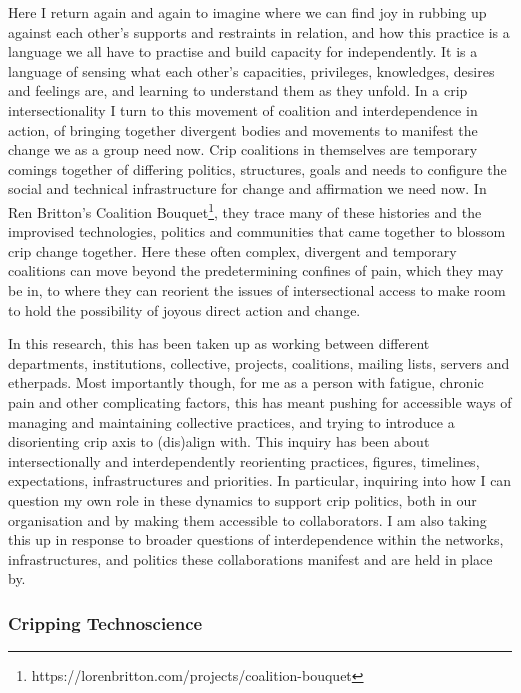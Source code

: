 Here I return again and again to imagine where we can find joy in
rubbing up against each other's supports and restraints in relation, and
how this practice is a language we all have to practise and build
capacity for independently. It is a language of sensing what each
other's capacities, privileges, knowledges, desires and feelings are,
and learning to understand them as they unfold. In a crip
intersectionality I turn to this movement of coalition and
interdependence in action, of bringing together divergent bodies and
movements to manifest the change we as a group need now. Crip coalitions
in themselves are temporary comings together of differing politics,
structures, goals and needs to configure the social and technical
infrastructure for change and affirmation we need now. In Ren Britton's
Coalition Bouquet\footnote{https://lorenbritton.com/projects/coalition-bouquet},
they trace many of these histories and the improvised technologies,
politics and communities that came together to blossom crip change
together. Here these often complex, divergent and temporary coalitions
can move beyond the predetermining confines of pain, which they may be
in, to where they can reorient the issues of intersectional access to
make room to hold the possibility of joyous direct action and change.

In this research, this has been taken up as working between different
departments, institutions, collective, projects, coalitions, mailing
lists, servers and etherpads. Most importantly though, for me as a
person with fatigue, chronic pain and other complicating factors, this
has meant pushing for accessible ways of managing and maintaining
collective practices, and trying to introduce a disorienting crip axis
to (dis)align with. This inquiry has been about intersectionally and
interdependently reorienting practices, figures, timelines,
expectations, infrastructures and priorities. In particular, inquiring
into how I can question my own role in these dynamics to support crip
politics, both in our organisation and by making them accessible to
collaborators. I am also taking this up in response to broader questions
of interdependence within the networks, infrastructures, and politics
these collaborations manifest and are held in place by.

\hypertarget{cripping-technoscience}{%
\subsubsection{Cripping Technoscience}\label{cripping-technoscience}}

